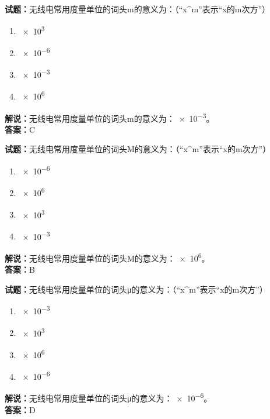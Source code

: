 \documentclass{ctexbook}
\begin{document}
\noindent\textbf{试题：}无线电常用度量单位的词头m的意义为：（“x\string^m”表示“x的m次方”）

\begin{enumerate}[leftmargin=3em]
  \item \num{e3}%
  \item \num{e-6}%
  \item \num{e-3}%
  \item \num{e6}%
\end{enumerate}

\noindent\textbf{解说：}无线电常用度量单位的词头m的意义为：\num{e-3}。\\
\noindent\textbf{答案：}C

\vspace{\baselineskip}

\noindent\textbf{试题：}无线电常用度量单位的词头M的意义为：（“x\string^m”表示“x的m次方”）

\begin{enumerate}[leftmargin=3em]
  \item \num{e-6}%
  \item \num{e6}%
  \item \num{e3}%
  \item \num{e-3}%
\end{enumerate}

\noindent\textbf{解说：}无线电常用度量单位的词头M的意义为：\num{e6}。\\
\noindent\textbf{答案：}B

\vspace{\baselineskip}

\noindent\textbf{试题：}无线电常用度量单位的词头μ的意义为：（“x\string^m”表示“x的m次方”）

\begin{enumerate}[leftmargin=3em]
  \item \num{e-3}%
  \item \num{e3}%
  \item \num{e6}%
  \item \num{e-6}%
\end{enumerate}

\noindent\textbf{解说：}无线电常用度量单位的词头μ的意义为：\num{e-6}。\\
\noindent\textbf{答案：}D
\end{document}
